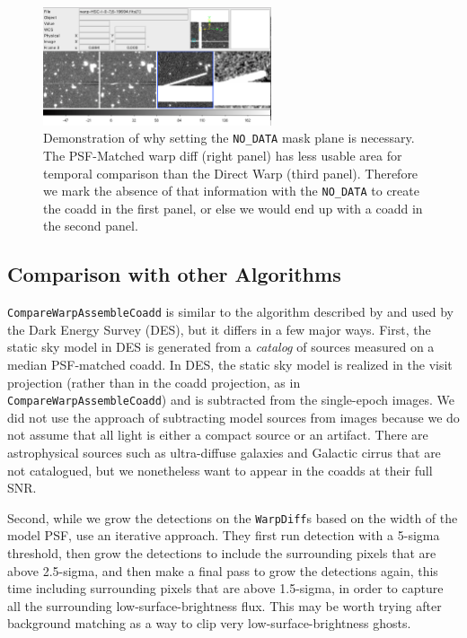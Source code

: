 \documentclass[DM,authoryear,toc]{lsstdoc}
\begin{document}
\begin{figure}
\begin{centering}
\includegraphics[width=0.6\textwidth]{figures/less_data.png}
\par\end{centering}
\caption{\label{fig:nodata}  Demonstration of why setting the \texttt{NO\_DATA} mask plane is necessary. The PSF-Matched warp diff (right panel) has less usable area for temporal comparison than the Direct Warp (third panel). Therefore we mark the absence of that information with the \texttt{NO\_DATA} to create the coadd in the first panel, or else we would end up with a coadd in the second panel.}
\end{figure}

\subsection{Comparison with other Algorithms}

\texttt{CompareWarpAssembleCoadd} is similar to the algorithm described by \citet{Desai2016} and used by the Dark Energy Survey (DES), but it differs in a few major ways.
First, the static sky model in DES  is generated from a \emph{catalog} of sources measured on a median PSF-matched coadd.
In DES, the static sky model is realized in the visit projection (rather than in the coadd projection, as in \texttt{CompareWarpAssembleCoadd}) and is subtracted from the single-epoch images.
We did not use the approach of subtracting model sources from images because we do not assume that all light is either a  compact source or an artifact.
There are astrophysical sources such as ultra-diffuse galaxies and Galactic cirrus  that are not catalogued, but we nonetheless want to appear in the coadds at their full SNR.

Second, while we grow the detections on the \texttt{WarpDiff}s  based on  the width of the model PSF, \citet{Desai2016} use an iterative approach.
They first run detection with a  5-sigma threshold,  then grow the detections to include the surrounding pixels that are above 2.5-sigma, and then make a final pass to grow the detections again, this time including surrounding pixels that are above 1.5-sigma,
in order to capture all the surrounding low-surface-brightness flux.
This may be worth trying after background matching as a way to clip very low-surface-brightness ghosts.
\end{document}

